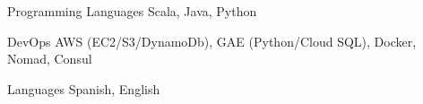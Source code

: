 


\begin{cvskills}






\cvskill
{Programming Languages} %
{Scala, Java, Python} %


\cvskill
{DevOps} %
{AWS (EC2/S3/DynamoDb), GAE (Python/Cloud SQL), Docker, Nomad, Consul} %


\cvskill
{Languages} %
{Spanish, English} %




\end{cvskills}
